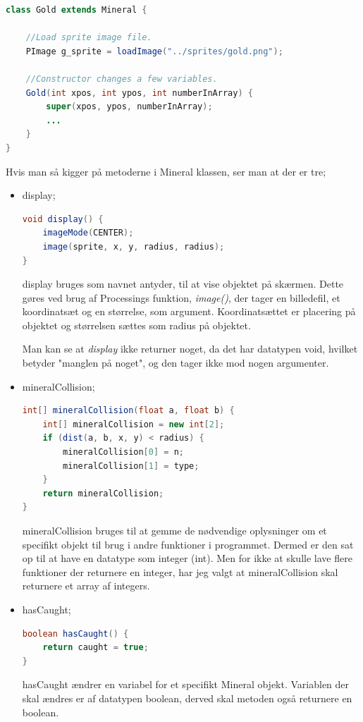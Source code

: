\documentclass[12pt,a4paper]{article}
\begin{document}
        \begin{lstlisting}[language=Java, caption=Gold klassen]
class Gold extends Mineral {
  
    //Load sprite image file.
    PImage g_sprite = loadImage("../sprites/gold.png");
  
    //Constructor changes a few variables.
    Gold(int xpos, int ypos, int numberInArray) {
        super(xpos, ypos, numberInArray);
        ...
    }
}
\end{lstlisting}

    Hvis man så kigger på metoderne i Mineral klassen, ser man at der er tre; 
    \begin{itemize}
        \item display;
\begin{lstlisting}[language=Java]
    void display() {
    imageMode(CENTER);
    image(sprite, x, y, radius, radius);
}
\end{lstlisting}
        display bruges som navnet antyder, til at vise objektet på skærmen. Dette gøres ved brug af Processings funktion, \emph{image()}, der tager en billedefil, et koordinatsæt og en størrelse, som argument. Koordinatsættet er placering på objektet og størrelsen sættes som radius på objektet.

        Man kan se at \emph{display} ikke returner noget, da det har datatypen void, hvilket betyder "manglen på noget", og den tager ikke mod nogen argumenter.
        
        \item mineralCollision;
\begin{lstlisting}[language=Java]
int[] mineralCollision(float a, float b) {
    int[] mineralCollision = new int[2];
    if (dist(a, b, x, y) < radius) {
        mineralCollision[0] = n;
        mineralCollision[1] = type;
    }
    return mineralCollision;
}
\end{lstlisting}

        mineralCollision bruges til at gemme de nødvendige oplysninger om et specifikt objekt til brug i andre funktioner i programmet. Dermed er den sat op til at have en datatype som integer (int). Men for ikke at skulle lave flere funktioner der returnere en integer, har jeg valgt at mineralCollision skal returnere et array af integers. 

        \item hasCaught;
\begin{lstlisting}[language=Java]
boolean hasCaught() {
    return caught = true;
}
\end{lstlisting}

    hasCaught ændrer en variabel for et specifikt Mineral objekt. Variablen der skal ændres er af datatypen boolean, derved skal metoden også returnere en boolean.
    \end{itemize}
\end{document}
